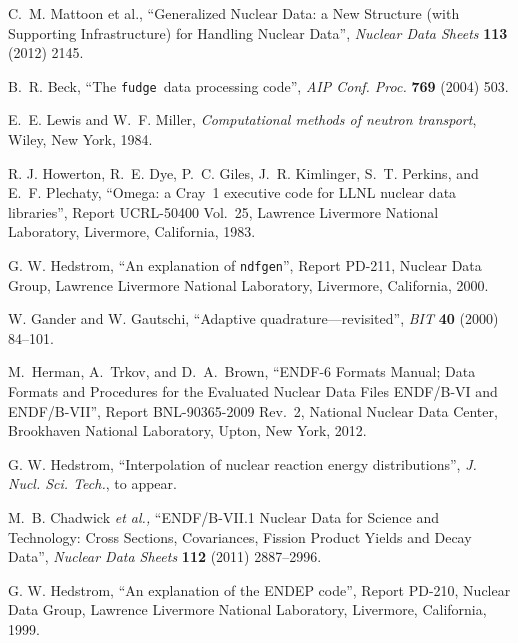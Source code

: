 \documentclass[11pt]{report}
\newcommand{\xndfgen}{\texttt{fudge}}
\newcommand{\ndfgen}{\texttt{ndfgen}}
\begin{document}
\begin{thebibliography}{99}
\frenchspacing

 C.~M. Mattoon et al.,
``Generalized Nuclear Data: a New Structure (with Supporting Infrastructure) 
for Handling Nuclear Data'',
\textit{Nuclear Data Sheets} \textbf{113} (2012) 2145.

 B.~R. Beck,
``The \xndfgen\ data processing code'',
\textit{AIP Conf. Proc.} \textbf{769} (2004) 503.

 E.~E. Lewis and W.~F. Miller,
\textit{Computational methods of neutron transport},
Wiley, New York, 1984.

 R. J. Howerton, R.~E. Dye, P.~C. Giles,
J.~R. Kimlinger, S.~T. Perkins, and E.~F. Plechaty,
``Omega: a Cray~1 executive code for LLNL nuclear data
libraries'',
Report UCRL-50400 Vol.~25, 
Lawrence Livermore National Laboratory, Livermore, California,
1983.

 G. W. Hedstrom, ``An explanation of
\ndfgen'', Report PD-211, Nuclear Data Group,
Lawrence Livermore National Laboratory, Livermore, California,
2000.

 W. Gander and W. Gautschi,
``Adaptive quadrature---revisited'', \textit{BIT} \textbf{40} (2000) 84--101.

 M.~Herman, A.~Trkov, and D.\ A.\ Brown,
``ENDF-6 Formats Manual;
Data Formats and Procedures for the Evaluated Nuclear Data Files ENDF/B-VI and ENDF/B-VII'',
Report BNL-90365-2009 Rev.~2,
National Nuclear Data Center,
Brookhaven National Laboratory,
Upton, New York, 2012.

 G. W. Hedstrom, 
``Interpolation of nuclear reaction energy distributions'', 
\textit{J. Nucl. Sci. Tech.}, to appear.

 M.~B. Chadwick \textit{et al.,}
``ENDF/B-VII.1 Nuclear Data for Science and Technology: Cross Sections, Covariances, Fission Product Yields and Decay Data'',
\textit{Nuclear Data Sheets} \textbf{112} (2011) 2887--2996.


 G. W. Hedstrom, ``An explanation of
the \textsf{ENDEP} code'', Report PD-210, Nuclear Data Group,
Lawrence Livermore National Laboratory, Livermore, California,
1999.


\end{thebibliography}
\end{document}
